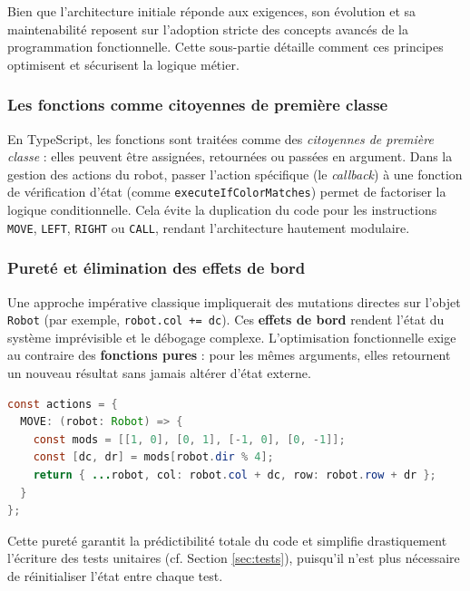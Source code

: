 \documentclass[12pt,a4paper]{article}
\begin{document}
Bien que l'architecture initiale réponde aux exigences, son évolution et sa maintenabilité reposent sur l'adoption stricte des concepts avancés de la programmation fonctionnelle. 
Cette sous-partie détaille comment ces principes optimisent et sécurisent la logique métier.

\subsubsection*{Les fonctions comme citoyennes de première classe}
En TypeScript, les fonctions sont traitées comme des \textit{citoyennes de première classe} : 
elles peuvent être assignées, retournées ou passées en argument. 
Dans la gestion des actions du robot, passer l'action spécifique (le \textit{callback}) à une fonction de vérification d'état (comme \texttt{executeIfColorMatches}) permet de factoriser la logique conditionnelle. 
Cela évite la duplication du code pour les instructions \texttt{MOVE}, \texttt{LEFT}, \texttt{RIGHT} ou \texttt{CALL}, 
rendant l'architecture hautement modulaire.

\subsubsection*{Pureté et élimination des effets de bord}
Une approche impérative classique impliquerait des mutations directes sur l'objet \texttt{Robot} (par exemple, \texttt{robot.col += dc}). 
Ces \textbf{effets de bord} rendent l'état du système imprévisible et le débogage complexe. 
L'optimisation fonctionnelle exige au contraire des \textbf{fonctions pures} : 
pour les mêmes arguments, elles retournent un nouveau résultat sans jamais altérer d'état externe.

\begin{lstlisting}[language=Java, basicstyle=\ttfamily\small, frame=single, title={Exemple d'approche pure pour le déplacement}]
const actions = {
  MOVE: (robot: Robot) => {
    const mods = [[1, 0], [0, 1], [-1, 0], [0, -1]];
    const [dc, dr] = mods[robot.dir % 4];
    return { ...robot, col: robot.col + dc, row: robot.row + dr };
  }
};
\end{lstlisting}

Cette pureté garantit la prédictibilité totale du code et simplifie drastiquement l'écriture des tests unitaires (cf. Section \ref{sec:tests}), 
puisqu'il n'est plus nécessaire de réinitialiser l'état entre chaque test.
\end{document}
